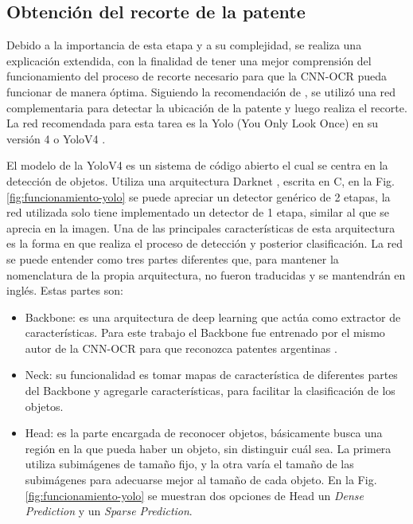 \subsection{Obtención del recorte de la patente}

Debido a la importancia de esta etapa y a su complejidad, se realiza una explicación extendida, con la finalidad de tener una mejor comprensión del funcionamiento del proceso de recorte necesario para que la CNN-OCR pueda funcionar de manera óptima. Siguiendo la recomendación de \cite{ankandrew_reconocedor_2023}, se utilizó una red complementaria para detectar la ubicación de la patente y luego realiza el recorte. La red recomendada para esta tarea es la Yolo (You Only Look Once) en su versión 4 o YoloV4 \cite{bochkovskiy_yolov4_2020}.

El modelo de la YoloV4 es un sistema de código abierto el cual se centra en la detección de objetos. Utiliza una arquitectura Darknet \cite{noauthor_darknet_nodate}, escrita en C, en la Fig.\ref{fig:funcionamiento-yolo} se puede apreciar un detector genérico de 2 etapas, la red utilizada solo tiene implementado un detector de 1 etapa, similar al que se aprecia en la imagen.
Una de las principales características de esta arquitectura es la forma en que realiza el proceso de detección y posterior clasificación. La red se puede entender como tres partes diferentes que, para mantener la nomenclatura de la propia arquitectura, no fueron traducidas y se mantendrán en inglés. Estas partes son:

\begin{itemize}
    \item Backbone: es una arquitectura de deep learning que actúa como extractor de características.
          Para este trabajo el Backbone fue entrenado por el mismo autor de la CNN-OCR para que reconozca patentes argentinas \cite{ankandrew_localizador_2021}.
    \item Neck: su funcionalidad es tomar mapas de característica de diferentes partes del Backbone y agregarle características, para facilitar la clasificación de los objetos.

    \item Head: es la parte encargada de reconocer objetos, básicamente busca una región en la que pueda haber un objeto, sin distinguir cuál sea. La primera utiliza subimágenes de tamaño fijo, y la otra varía el tamaño de las subimágenes para adecuarse mejor al tamaño de cada objeto.
          En la Fig. \ref{fig:funcionamiento-yolo} se muestran dos opciones de Head un \textit{Dense Prediction} y un \textit{Sparse Prediction}.
\end{itemize}

